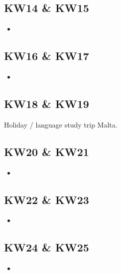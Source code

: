 \subsection{KW14 \& KW15}
\label{ssec:KW14_KW15}
\begin{itemize}
    \item 
\end{itemize}


\subsection{KW16 \& KW17}
\label{ssec:KW16_KW17}
\begin{itemize}
    \item 
\end{itemize}


\subsection{KW18 \& KW19}
\label{ssec:KW18_KW19}
Holiday / language study trip Malta.


\subsection{KW20 \& KW21}
\label{ssec:KW20_KW21}
\begin{itemize}
    \item 
\end{itemize}


\subsection{KW22 \& KW23}
\label{ssec:KW22_KW23}
\begin{itemize}
    \item 
\end{itemize}


\subsection{KW24 \& KW25}
\label{ssec:KW24_KW25}
\begin{itemize}
    \item 
\end{itemize}
\newpage




